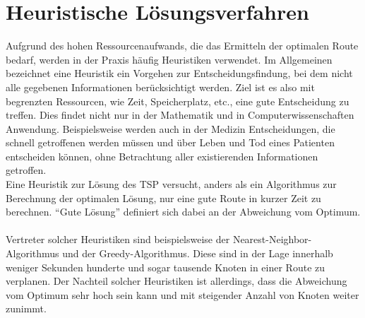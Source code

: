 \section{Heuristische Lösungsverfahren}
Aufgrund des hohen Ressourcenaufwands, die das Ermitteln der optimalen Route bedarf, werden in der Praxis häufig Heuristiken verwendet.
Im Allgemeinen bezeichnet eine Heuristik ein Vorgehen zur Entscheidungsfindung, bei dem nicht alle gegebenen Informationen berücksichtigt werden.
Ziel ist es also mit begrenzten Ressourcen, wie Zeit, Speicherplatz, etc., eine gute Entscheidung zu treffen.\autocite[S. 14f.]{Gigerenzer.1999}
Dies findet nicht nur in der Mathematik und in Computerwissenschaften Anwendung.
Beispielsweise werden auch in der Medizin Entscheidungen, die schnell getroffenen werden müssen und über Leben und Tod eines Patienten entscheiden können, ohne Betrachtung aller existierenden Informationen getroffen.\autocite[3]{Gigerenzer.1999}
\\
Eine Heuristik zur Lösung des \ac{TSP} versucht, anders als ein Algorithmus zur Berechnung der optimalen Lösung, nur eine gute Route in kurzer Zeit zu berechnen.
\enquote{Gute Lösung} definiert sich dabei an der Abweichung vom Optimum.
\\\\
Vertreter solcher Heuristiken sind beispielsweise der Nearest-Neighbor-Algorithmus und der Greedy-Algorithmus.
Diese sind in der Lage innerhalb weniger Sekunden hunderte und sogar tausende Knoten in einer Route zu verplanen.
Der Nachteil solcher Heuristiken ist allerdings, dass die Abweichung vom Optimum sehr hoch sein kann und mit steigender Anzahl von Knoten weiter zunimmt.\autocite[22]{Johnson.2001}